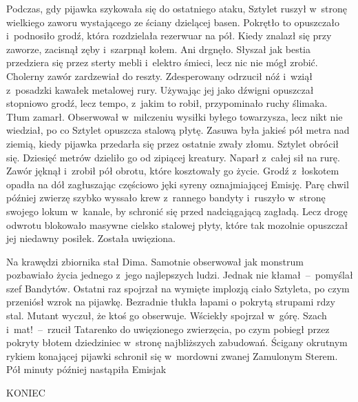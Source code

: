 \documentclass[../MAIN.tex]{subfiles}
\begin{document}
\qm
Podczas, gdy pijawka szykowała się do ostatniego ataku, Sztylet ruszył w~stronę wielkiego zaworu wystającego ze ściany dzielącej basen. Pokrętło to opuszczało i~podnosiło grodź, która rozdzielała rezerwuar na pół. Kiedy znalazł się przy zaworze, zacisnął zęby i~szarpnął kołem. Ani drgnęło. Słyszał jak bestia przedziera się przez sterty mebli i~elektro śmieci, lecz nic nie mógł zrobić. Cholerny zawór zardzewiał do reszty. Zdesperowany odrzucił nóź i~wziął z~posadzki kawałek metalowej rury. Używając jej jako dźwigni opuszczał stopniowo grodź, lecz tempo, z~jakim to robił, przypominało ruchy ślimaka. Tłum zamarł. Obserwował w~milczeniu wysiłki byłego towarzysza, lecz nikt nie wiedział, po co Sztylet opuszcza stalową płytę. Zasuwa była jakieś pół metra nad ziemią, kiedy pijawka przedarła się przez ostatnie zwały złomu. Sztylet obrócił się. Dziesięć metrów dzieliło go od zipiącej kreatury. Naparł z~całej sił na rurę. Zawór jęknął i~zrobił pół obrotu, które kosztowały go życie. Grodź z~łoskotem opadła na dół
zagłuszając częściowo jęki syreny oznajmiającej Emisję. Parę chwil później zwierzę szybko wyssało krew z~rannego bandyty i~ruszyło w~stronę swojego lokum w~kanale, by schronić się przed nadciągającą zagładą. Lecz drogę odwrotu blokowało masywne cielsko stalowej płyty, które tak mozolnie opuszczał jej niedawny posiłek. Została uwięziona.

\dd
Na krawędzi zbiornika stał Dima. Samotnie obserwował jak monstrum pozbawiało życia jednego z~jego najlepszych ludzi. Jednak nie kłamał~--~pomyślał szef Bandytów. Ostatni raz spojrzał na wymięte implozją ciało Sztyleta, po czym przeniósł wzrok na pijawkę. Bezradnie tłukła łapami o pokrytą strupami rdzy stal. Mutant wyczuł, że ktoś go obserwuje. Wściekły spojrzał w~górę.
\sd
\xx Szach i~mat!~--~rzucił Tatarenko do uwięzionego zwierzęcia, po czym pobiegł przez pokryty błotem dziedziniec w~stronę najbliższych zabudowań.
\qm
Ścigany okrutnym rykiem konającej pijawki schronił się w~mordowni zwanej Zamulonym Sterem. Pół minuty później nastąpiła Emisja\3k
\begin{center}
KONIEC
\end{center}
\end{document}
